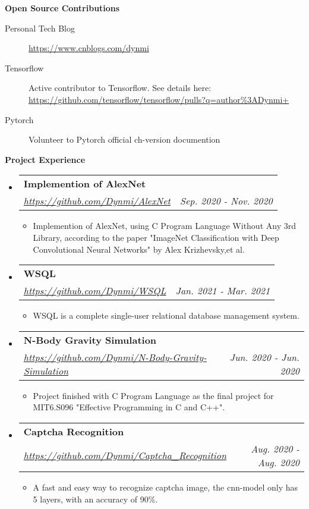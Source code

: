 \documentclass[letterpaper,11pt]{article}
\makeatletter
\newcommand{\resitem}[1]{\item #1 \vspace{-2pt}}
\newcommand{\resheading}[1]{{\large \colorbox{mygrey}{\begin{minipage}{\textwidth}{\textbf{#1 \vphantom{p\^{E}}}}\end{minipage}}}}
\newcommand{\ressubheading}[4]{
\begin{tabular*}{7.0in}{l@{\extracolsep{\fill}}r}
		\textbf{#1} & #2 \\
		\textit{#3} & \textit{#4} \\
\end{tabular*}\vspace{-6pt}}
\makeatother
\begin{document}
\resheading{Open Source Contributions}

\begin{description}
\item[Personal Tech Blog] \href{https://www.cnblogs.com/dynmi}{https://www.cnblogs.com/dynmi}
\item[Tensorflow] Active contributor to Tensorflow. See details here: \href{https://github.com/tensorflow/tensorflow/pulls?q=author\%3ADynmi+ }{https://github.com/tensorflow/tensorflow/pulls?q=author\%3ADynmi+ } 
\item[Pytorch] Volunteer to Pytorch official ch-version documention 
\end{description}

\resheading{Project Experience}
\begin{itemize}
\item
	\ressubheading{Implemention of AlexNet }{}{\href{https://github.com/Dynmi/AlexNet}{https://github.com/Dynmi/AlexNet}}{Sep. 2020 - Nov. 2020}
	\begin{itemize}
		\resitem{Implemention of AlexNet, using C Program Language Without Any 3rd Library, according to the paper "ImageNet Classification with Deep Convolutional
Neural Networks" by Alex Krizhevsky,et al.}
	\end{itemize}
\item
	\ressubheading{WSQL}{}{\href{https://github.com/Dynmi/WSQL}{https://github.com/Dynmi/WSQL}}{Jan. 2021 - Mar. 2021}
	\begin{itemize}
		\resitem{WSQL is a complete single-user relational database management system.}
	\end{itemize}
\item
	\ressubheading{N-Body Gravity Simulation}{}{\href{https://github.com/Dynmi/N-Body-Gravity-Simulation}{https://github.com/Dynmi/N-Body-Gravity-Simulation}}{Jun. 2020 - Jun. 2020}
	\begin{itemize}
		\resitem{Project finished with C Program Language as the final project for MIT6.S096 "Effective Programming in C and C++".}
	\end{itemize}
\item
	\ressubheading{Captcha Recognition}{}{\href{https://github.com/Dynmi/Captcha\_Recognition}{https://github.com/Dynmi/Captcha\_Recognition}}{Aug. 2020 - Aug. 2020}
	\begin{itemize}
		\resitem{} A fast and easy way to recognize captcha image, the cnn-model only has 5 layers, with an accuracy of 90\%.
	\end{itemize}

\end{itemize}
\end{document}
